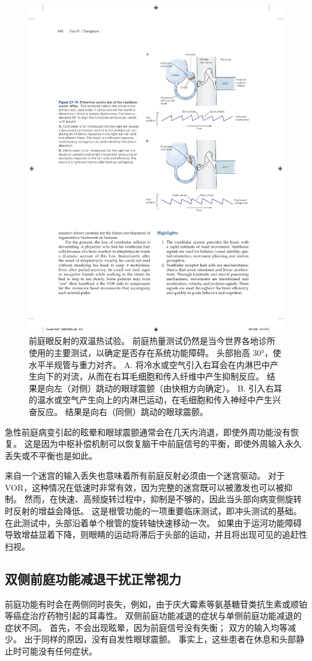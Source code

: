 \begin{figure}[htbp]
	\centering
	\includegraphics[width=0.6\linewidth]{chap27/fig_27_15}
	\caption{前庭眼反射的双温热试验。 前庭热量测试仍然是当今世界各地诊所使用的主要测试，以确定是否存在系统功能障碍。 头部抬高 30°，使水平半规管与重力对齐。 A. 将冷水或空气引入右耳会在内淋巴中产生向下的对流，从而在右耳毛细胞和传入纤维中产生抑制反应。 结果是向左（对侧）跳动的眼球震颤（由快相方向确定）。 B. 引入右耳的温水或空气产生向上的内淋巴运动，在毛细胞和传入神经中产生兴奋反应。 结果是向右（同侧）跳动的眼球震颤。}
	\label{fig:27_15}
\end{figure}

急性前庭病变引起的眩晕和眼球震颤通常会在几天内消退，即使外周功能没有恢复。
这是因为中枢补偿机制可以恢复脑干中前庭信号的平衡，即使外周输入永久丢失或不平衡也是如此。


来自一个迷宫的输入丢失也意味着所有前庭反射必须由一个迷宫驱动。
对于 VOR，这种情况在低速时非常有效，因为完整的迷宫既可以被激发也可以被抑制。
然而，在快速、高频旋转过程中，抑制是不够的，因此当头部向病变侧旋转时反射的增益会降低。
这是根管功能的一项重要临床测试，即冲头测试的基础。
在此测试中，头部沿着单个根管的旋转轴快速移动一次。
如果由于运河功能障碍导致增益显着下降，则眼睛的运动将滞后于头部的运动，并且将出现可见的追赶性扫视。



\subsection{双侧前庭功能减退干扰正常视力}

前庭功能有时会在两侧同时丧失，例如，由于庆大霉素等氨基糖苷类抗生素或顺铂等癌症治疗药物引起的耳毒性。
双侧前庭功能减退的症状与单侧前庭功能减退的症状不同。
首先，不会出现眩晕，因为前庭信号没有失衡； 双方的输入均等减少。
出于同样的原因，没有自发性眼球震颤。
事实上，这些患者在休息和头部静止时可能没有任何症状。


